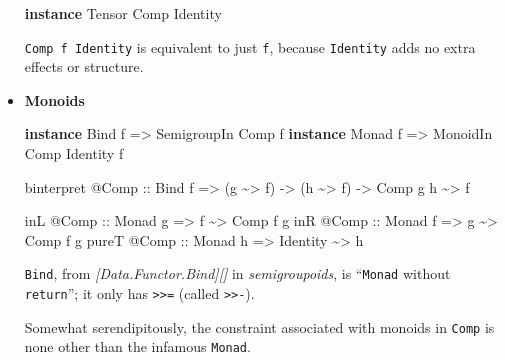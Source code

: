 \documentclass[]{article}
\newenvironment{Shaded}{}{}
\newcommand{\DataTypeTok}[1]{\textcolor[rgb]{0.56,0.13,0.00}{#1}}
\newcommand{\KeywordTok}[1]{\textcolor[rgb]{0.00,0.44,0.13}{\textbf{#1}}}
\newcommand{\NormalTok}[1]{#1}
\newcommand{\OperatorTok}[1]{\textcolor[rgb]{0.40,0.40,0.40}{#1}}
\newcommand{\OtherTok}[1]{\textcolor[rgb]{0.00,0.44,0.13}{#1}}
\begin{document}
\begin{itemize}
\begin{Shaded}
\begin{Highlighting}[]
\KeywordTok{instance} \DataTypeTok{Tensor} \DataTypeTok{Comp} \DataTypeTok{Identity}
\end{Highlighting}
\end{Shaded}

  \texttt{Comp\ f\ Identity} is equivalent to just \texttt{f}, because
  \texttt{Identity} adds no extra effects or structure.
\item
  \textbf{Monoids}

\begin{Shaded}
\begin{Highlighting}[]
\KeywordTok{instance} \DataTypeTok{Bind}\NormalTok{  f }\OtherTok{=>} \DataTypeTok{SemigroupIn} \DataTypeTok{Comp}\NormalTok{ f}
\KeywordTok{instance} \DataTypeTok{Monad}\NormalTok{ f }\OtherTok{=>} \DataTypeTok{MonoidIn}    \DataTypeTok{Comp} \DataTypeTok{Identity}\NormalTok{ f}

\NormalTok{binterpret }\OperatorTok{@}\DataTypeTok{Comp}
\OtherTok{    ::} \DataTypeTok{Bind}\NormalTok{ f}
    \OtherTok{=>}\NormalTok{ (g }\OperatorTok{\textasciitilde{}>}\NormalTok{ f)}
    \OtherTok{{-}>}\NormalTok{ (h }\OperatorTok{\textasciitilde{}>}\NormalTok{ f)}
    \OtherTok{{-}>} \DataTypeTok{Comp}\NormalTok{ g h }\OperatorTok{\textasciitilde{}>}\NormalTok{ f}

\NormalTok{inL   }\OperatorTok{@}\DataTypeTok{Comp}\OtherTok{ ::} \DataTypeTok{Monad}\NormalTok{ g }\OtherTok{=>}\NormalTok{ f        }\OperatorTok{\textasciitilde{}>} \DataTypeTok{Comp}\NormalTok{ f g}
\NormalTok{inR   }\OperatorTok{@}\DataTypeTok{Comp}\OtherTok{ ::} \DataTypeTok{Monad}\NormalTok{ f }\OtherTok{=>}\NormalTok{ g        }\OperatorTok{\textasciitilde{}>} \DataTypeTok{Comp}\NormalTok{ f g}
\NormalTok{pureT }\OperatorTok{@}\DataTypeTok{Comp}\OtherTok{ ::} \DataTypeTok{Monad}\NormalTok{ h }\OtherTok{=>} \DataTypeTok{Identity} \OperatorTok{\textasciitilde{}>}\NormalTok{ h}
\end{Highlighting}
\end{Shaded}

  \texttt{Bind}, from \emph{{[}Data.Functor.Bind{]}{[}{]}} in
  \emph{semigroupoids}, is ``\texttt{Monad} without \texttt{return}''; it only
  has \texttt{\textgreater{}\textgreater{}=} (called
  \texttt{\textgreater{}\textgreater{}-}).

  Somewhat serendipitously, the constraint associated with monoids in
  \texttt{Comp} is none other than the infamous \texttt{Monad}.


\end{itemize}
\end{document}
